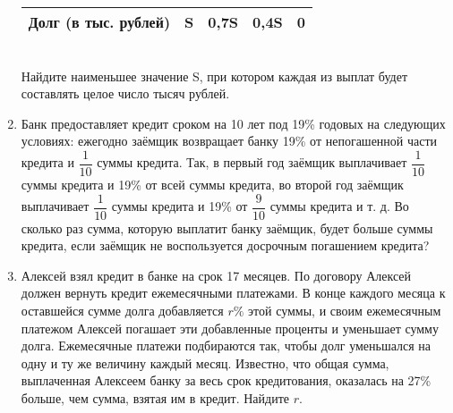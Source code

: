 \documentclass[12pt, a4paper]{article}
\begin{document}
\begin{enumerate}
\begin{tabular}{ | l | c | c |  c | c |}
			Долг (в тыс. рублей) & S & 0,7S & 0,4S & 0 \\
			\hline
		\end{tabular}
		\\Найдите наименьшее значение S, при котором каждая из выплат
		будет составлять целое число тысяч рублей.
		\item Банк предоставляет кредит сроком на 10 лет под 19\% годовых на следующих условиях: ежегодно заёмщик возвращает банку 19\% от непогашенной части кредита и $\dfrac{1}{10}$ суммы кредита. Так, в первый год заёмщик выплачивает $\dfrac{1}{10}$ суммы кредита и 19\% от всей суммы кредита, во второй год заёмщик выплачивает $\dfrac{1}{10}$ суммы кредита и 19\% от $\dfrac{9}{10}$ суммы кредита и т. д. Во сколько раз сумма, которую выплатит банку заёмщик, будет больше суммы кредита, если заёмщик не воспользуется досрочным погашением кредита?
		\item Алексей взял кредит в банке на срок 17 месяцев. По договору Алексей должен вернуть кредит ежемесячными платежами. В конце каждого месяца к оставшейся сумме долга добавляется $r\%$ этой суммы, и своим ежемесячным платежом Алексей погашает эти добавленные проценты и уменьшает сумму долга. Ежемесячные платежи подбираются так, чтобы долг уменьшался на одну и ту же величину каждый месяц. Известно, что общая сумма, выплаченная Алексеем банку за весь срок кредитования, оказалась на 27\% больше, чем сумма, взятая им в кредит. Найдите $r$.
	\end{enumerate}
	
\end{document}
